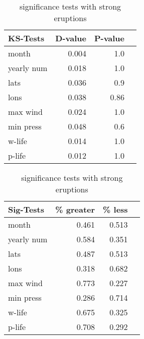 \documentclass[smallextended]{svjour3}       %
\begin{document}
\begin{table}[!tbp]
\centering
\begin{minipage}[b]{0.45\textwidth}
\begin{tabular}{lrrr}
\toprule
             KS-Tests & D-value & P-value \\
\midrule
month & 0.004 & 1.0 \\
yearly num & 0.018 & 1.0 \\
lats & 0.036 & 0.9 \\
lons & 0.038 & 0.86 \\
max wind & 0.024 & 1.0 \\
min press & 0.048 & 0.6 \\
w-life & 0.014 & 1.0 \\
p-life & 0.012 & 1.0 \\

\bottomrule
\end{tabular}
\caption{ks-tests with strong eruptions}
\label{ks_10}
\end{minipage}
\hfill
\begin{minipage}[b]{0.45\textwidth}
\begin{tabular}{lrrr}
\toprule
             Sig-Tests & \% greater & \% less \\
\midrule

month & 0.461 & 0.513 \\
yearly num & 0.584 & 0.351 \\
lats & 0.487 & 0.513 \\
lons & 0.318 & 0.682 \\
max wind & 0.773 & 0.227 \\
min press & 0.286 & 0.714 \\
w-life & 0.675 & 0.325 \\
p-life & 0.708 & 0.292 \\

\bottomrule
\end{tabular}
\caption{significance tests with strong eruptions}
\label{sig_10}
\end{minipage}
\end{table}
\end{document}
